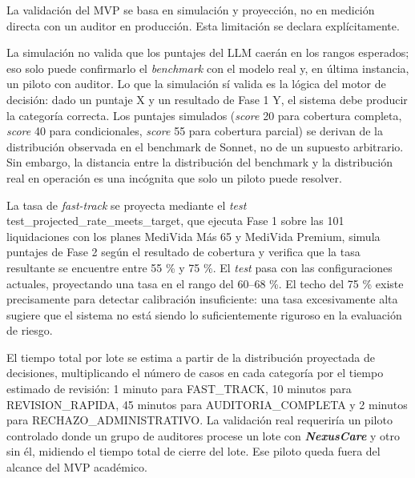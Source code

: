 La validación del MVP se basa en simulación y proyección, no en medición directa con un auditor en producción. Esta limitación se declara explícitamente.

La simulación no valida que los puntajes del LLM caerán en los rangos esperados; eso solo puede confirmarlo el \textit{benchmark} con el modelo real y, en última instancia, un piloto con auditor. Lo que la simulación sí valida es la lógica del motor de decisión: dado un puntaje X y un resultado de Fase 1 Y, el sistema debe producir la categoría correcta. Los puntajes simulados (\textit{score} 20 para cobertura completa, \textit{score} 40 para condicionales, \textit{score} 55 para cobertura parcial) se derivan de la distribución observada en el benchmark de Sonnet, no de un supuesto arbitrario. Sin embargo, la distancia entre la distribución del benchmark y la distribución real en operación es una incógnita que solo un piloto puede resolver.

La tasa de \textit{fast-track} se proyecta mediante el \textit{test} test\_projected\_rate\_meets\_target, que ejecuta Fase 1 sobre las 101 liquidaciones con los planes MediVida Más 65 y MediVida Premium, simula puntajes de Fase 2 según el resultado de cobertura y verifica que la tasa resultante se encuentre entre 55 \% y 75 \%. El \textit{test} pasa con las configuraciones actuales, proyectando una tasa en el rango del 60–68 \%. El techo del 75 \% existe precisamente para detectar calibración insuficiente: una tasa excesivamente alta sugiere que el sistema no está siendo lo suficientemente riguroso en la evaluación de riesgo.

El tiempo total por lote se estima a partir de la distribución proyectada de decisiones, multiplicando el número de casos en cada categoría por el tiempo estimado de revisión: 1 minuto para FAST\_TRACK, 10 minutos para REVISION\_RAPIDA, 45 minutos para AUDITORIA\_COMPLETA y 2 minutos para RECHAZO\_ADMINISTRATIVO. La validación real requeriría un piloto controlado donde un grupo de auditores procese un lote con \textbf{\textit{NexusCare}} y otro sin él, midiendo el tiempo total de cierre del lote. Ese piloto queda fuera del alcance del MVP académico.
